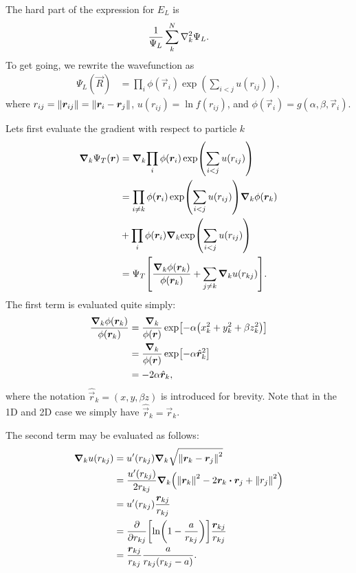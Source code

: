 \documentclass[twocolumn]{article}
\begin{document}
The hard part of the expression for $E_L$ is
\begin{align}
    \frac{1}{\Psi_L}\sum_{k}^N\laplacian_k{\Psi_L}.
\end{align}
To get going, we rewrite the wavefunction as
\begin{align}
    \Psi_L(\vec R) &= \prod_i \phi(\vec r_i)\exp(\sum_{i<j}u(r_{ij})),
\end{align}
where $r_{ij} = \norm{\bm r_{ij}} = \norm{\bm r_i - \bm r_j}$, $u(r_{ij}) =
\ln f(r_{ij})$, and $\phi(\vec r_i)=g(\alpha,\beta,\vec r_i)$.

Lets first evaluate the gradient with respect to particle $k$
\begin{align}
    \begin{split}
    \grad_k{\Psi_T(\bm r)}  
    &= \grad_k{\prod_i \phi(\bm r_i)\exp(\sum_{i<j}u(r_{ij}))}\\
    &= \prod_{i\neq k} \phi(\bm r_i)\exp(\sum_{i<j}u(r_{ij}))\grad_k{\phi(\bm
    r_k)}\\
    &+ \prod_{i} \phi(\bm r_i)\grad_k{\exp(\sum_{i<j}u(r_{ij}))}\\
    &= \Psi_T\qty[\frac{\grad_k \phi(\bm r_k)}{\phi(\bm r_k)} + \sum_{j\neq k}
    \grad_k u(r_{kj})].
    \end{split}\label{eq:grad-trail-wf}
\end{align}
The first term is evaluated quite simply:
\begin{align}
    \begin{split}
    \frac{\grad_k\phi(\bm r_k)}{\phi(\bm r_k)} &= \frac{\grad_k}{\phi(\bm r)}
    \exp[-\alpha\qty(x_k^2 + y_k^2 + \beta z_k^2)]\\
    &= \frac{\grad_k}{\phi(\bm r)}\exp[-\alpha\hat{\bm r}_k^2]\\
    &= -2\alpha \hat{\bm r}_k,
    \end{split}\label{eq:grad-phi_k-over-phi_k}
\end{align}
where the notation $\hat{\vec r}_k = (x, y, \beta z)$ is introduced for brevity.
Note that in the 1D and 2D case we simply have $\hat{\vec r}_k = \vec r_k$.


The second term may be evaluated as follows:
\begin{align}
    \begin{split}
    \grad_k u(r_{kj}) &= u'(r_{kj})\grad_k \sqrt{\norm{\vec r_k - \vec r_j}^2} \\
    &= \frac{u'(r_{kj})}{2r_{kj}}\grad_k\qty(\norm{\vec r_k}^2-2\vec r_k\vdot\vec
    r_j+\norm{r_j}^2)\\
    &= u'(r_{kj})\frac{\vec r_{kj}}{r_{kj}}\\
    &= \pdv{}{r_{kj}}\qty[ \ln(1 - \frac{a}{r_{kj}})] \frac{\vec
    r_{kj}}{r_{kj}}\\
    &= \frac{\vec r_{kj}}{r_{kj}}\frac{a}{r_{kj}(r_{kj}-a)}.
    \end{split}\label{eq:grad-u}
\end{align}
\end{document}

